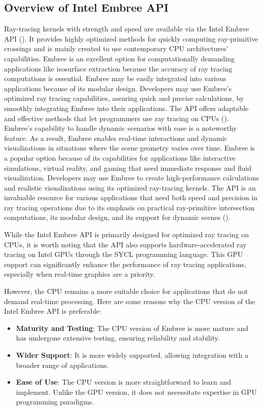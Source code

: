 \subsection{Overview of Intel Embree API} \label{Intel-Embree-Overview}
Ray-tracing kernels with strength and speed are available via the Intel Embree API (\cite{Sato_2021}). It provides highly optimized methods for quickly computing ray-primitive crossings and is mainly created to use contemporary CPU architectures' capabilities. Embree is an excellent option for computationally demanding applications like isosurface extraction because the accuracy of ray tracing computations is essential. Embree may be easily integrated into various applications because of its modular design. Developers may use Embree's optimized ray tracing capabilities, assuring quick and precise calculations, by smoothly integrating Embree into their applications. The API offers adaptable and effective methods that let programmers use ray tracing on CPUs (\cite{Ingo_2014}).
Embree's capability to handle dynamic scenarios with ease is a noteworthy feature. As a result, Embree enables real-time interactions and dynamic visualizations in situations where the scene geometry varies over time. Embree is a popular option because of its capabilities for applications like interactive simulations, virtual reality, and gaming that need immediate response and fluid visualization. Developers may use Embree to create high-performance calculations and realistic visualizations using its optimized ray-tracing kernels. The API is an invaluable resource for various applications that need both speed and precision in ray tracing operations due to its emphasis on practical ray-primitive intersection computations, its modular design, and its support for dynamic scenes (\cite{Sato_2021}).

While the Intel Embree API is primarily designed for optimized ray tracing on CPUs, it is worth noting that the API also supports hardware-accelerated ray tracing on Intel GPUs through the SYCL programming language. This GPU support can significantly enhance the performance of ray tracing applications, especially when real-time graphics are a priority.

However, the CPU remains a more suitable choice for applications that do not demand real-time processing. Here are some reasons why the CPU version of the Intel Embree API is preferable:

\begin{itemize}
    \item \textbf{Maturity and Testing}: The CPU version of Embree is more mature and has undergone extensive testing, ensuring reliability and stability.
    \item \textbf{Wider Support}: It is more widely supported, allowing integration with a broader range of applications.
    \item \textbf{Ease of Use}: The CPU version is more straightforward to learn and implement. Unlike the GPU version, it does not necessitate expertise in GPU programming paradigms.
\end{itemize}

